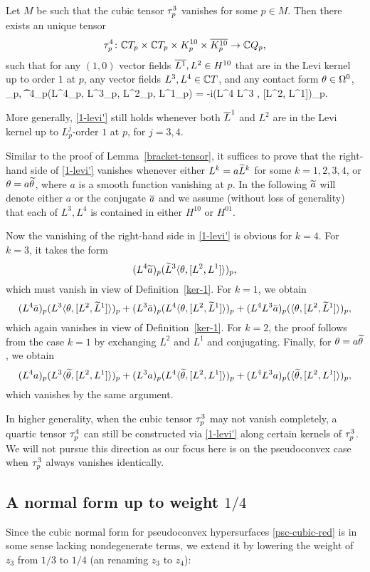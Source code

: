 \documentclass[12pt]{amsart}
\begin{document}
\bl{}
Let $M$ be such that the cubic tensor $\tau^3_p$ vanishes for some $p\in M$.
Then there exists an unique tensor
$$
	\tau^4_p \colon  {\mathbb{C}} T_p \times {\mathbb{C}} T_p 
	\times K^{10}_p\times \overline{K^{10}_p} \to {\mathbb{C}} Q_p,
$$
such that for any $(1,0)$ vector fields
$\overline{L^1}, L^2\in H^{10}$ that are in the Levi kernel
up to order $1$ at $p$,
any vector fields $L^3, L^4\in {\mathbb{C}} T$,
and any contact form $\theta\in \Omega^0$,
\beq{}
	\la \th_p, \t^4_p(L^4_p, L^3_p, L^2_p, L^1_p)\ra 
	= -i(L^4 L^3 \la \th, [L^2, L^1]\ra)_p.
\eeq

More generally, \eqref{1-levi'} still holds
whenever both $\overline{L}^1$ and $L^2$
are in the Levi kernel
up to $L^j_p$-order $1$ at $p$, for $j=3,4$.
\el

\bpf
Similar to the proof of Lemma~\ref{bracket-tensor},
it suffices to prove that the right-hand side of \eqref{1-levi'}
vanishes whenever
either $L^k=a\widetilde{L}^k$ for some $k=1,2,3,4$, 
or $\theta = a\widetilde{\theta}$, where $a$ is a smooth function vanishing at $p$.
In the following $\widetilde{a}$ will denote either $a$ or the conjugate $\overline{a}$
and we assume (without loss of generality)
that each of $L^3, L^4$
is contained in either $H^{10}$ or $H^{01}$.

Now the vanishing of the right-hand side in \eqref{1-levi'} 
is obvious for $k=4$.
For $k=3$, it takes
the form
$$
	(L^4\widetilde{a})_p (\widetilde{L}^3 \langle \theta, [L^2, L^1] \rangle)_p,	
$$
which must vanish in view of Definition~\ref{ker-1}.
For $k=1$, we obtain
$$
	(L^4 \bar a)_p (L^3 \langle \theta, [L^2, \widetilde{L}^1] \rangle)_p
	+ 	(L^3 \bar a)_p (L^4 \langle \theta, [L^2, \widetilde{L}^1] \rangle)_p
	+ 	(L^4 L^3 \bar a)_p (\langle \theta, [L^2, \widetilde{L}^1] \rangle)_p
	,
$$
which again vanishes in view of Definition~\ref{ker-1}.
For $k=2$, the proof follows from the case $k=1$
by exchanging $L^2$ and $L^1$ and conjugating.
Finally, for $\theta = a \widetilde{\theta}$, we obtain
$$
	(L^4 a)_p (L^3 \langle \widetilde{\theta}, [L^2, L^1] \rangle)_p
	+ 	(L^3 a)_p (L^4 \langle \widetilde{\theta}, [L^2, L^1] \rangle)_p
	+ 	(L^4 L^3 a)_p (\langle \widetilde{\theta}, [L^2, L^1] \rangle)_p,
$$
which vanishes by the same argument.
\epf


\br
In higher generality, when the cubic tensor $\tau^3_p$ may not vanish completely,
a quartic tensor $\tau^4_p$ can still be constructed via \eqref{1-levi'} 
along certain kernels of $\tau^3_p$.
We will not pursue this direction as our focus here is on 
the pseudoconvex case when $\tau^3_p$ always vanishes identically.
\er







\subsection{A normal form up to weight $1/4$}
Since the cubic normal form for pseudoconvex hypersurfaces \eqref{psc-cubic-red}
is in some sense lacking nondegenerate terms, 
we extend it by lowering the weight of $z_3$ from $1/3$ to $1/4$
(an renaming $z_3$ to $z_4$):
\end{document}
